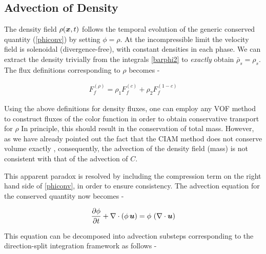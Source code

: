 \subsection*{Advection of Density}

The density field $\rho(\boldsymbol{x},t)$ follows the 
temporal evolution of the generic conserved quantity
(\ref{phiconv}) by setting $\phi = \rho$. 
At the incompressible limit the velocity field is 
solenoidal (divergence-free), with constant densities 
in each phase. We can extract the density trivially from the integrals 
\eqref{barphi2} to \textit{exactly} obtain $\bar \rho_s = \rho_s$. 
The flux definitions corresponding to $\rho$ becomes -   


\begin{align}
F_f^{(\rho)} = \rho_1 F_f^{(c)} +  \rho_2 F_f^{(1-c)}
\label{fluxrho}
\end{align}



Using the above definitions for density fluxes,
one can employ any VOF method to construct fluxes of the color 
function in order to obtain conservative transport for $\rho$
In principle, this should result in the conservation of total mass.  
However, as we have already pointed out the fact that the CIAM
method does not conserve volume exactly 
, consequently, the advection of the density field (mass) 
is not consistent with that of the advection of $C$. 

This apparent paradox is resolved by including the 
compression term on the right hand side of \eqref{phiconv},
in order to ensure consistency. 
The advection equation for the conserved quantity now becomes - 


\begin{align}
\frac{\partial \phi}{\partial t} + \nabla \cdot ( \phi \,\boldsymbol{u})  = \phi \, \left(\nabla \cdot \boldsymbol{u}\right) 
\label{phiconv2}
\end{align}


This equation can be decomposed into advection substeps corresponding to 
the direction-split integration framework as follows - 



